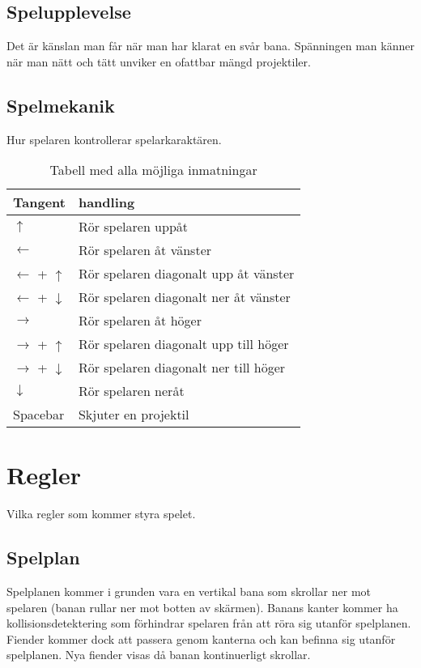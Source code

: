 \documentclass{TDP005mall}
\begin{document}
\subsection{Spelupplevelse}
Det är känslan man får när man har klarat en svår bana.
Spänningen man känner när man nätt och tätt unviker en ofattbar mängd projektiler.

\subsection{Spelmekanik}
Hur spelaren kontrollerar spelarkaraktären.
\begin{table}[H]
\caption{Tabell med alla möjliga inmatningar}
\begin{tabularx}{\linewidth}{|l|X|}
\hline
  Tangent & handling \\\hline
  $\uparrow$ & Rör spelaren uppåt \\\hline
  $\leftarrow$ & Rör spelaren åt vänster \\\hline
  $\leftarrow$ + $\uparrow$ & Rör spelaren diagonalt upp åt vänster \\\hline
  $\leftarrow$ + $\downarrow$ & Rör spelaren diagonalt ner åt vänster \\\hline
  $\rightarrow$ & Rör spelaren åt höger \\\hline
  $\rightarrow$ + $\uparrow$ & Rör spelaren diagonalt upp till höger \\\hline
  $\rightarrow$ + $\downarrow$ & Rör spelaren diagonalt ner till höger \\\hline
  $\downarrow$ & Rör spelaren neråt \\\hline
  Spacebar & Skjuter en projektil \\\hline  
\end{tabularx}
\end{table}
\clearpage
\section{Regler}
Vilka regler som kommer styra spelet.
\subsection{Spelplan}

Spelplanen kommer i grunden vara en vertikal bana som skrollar ner mot spelaren (banan rullar ner mot botten av skärmen).
Banans kanter kommer ha kollisionsdetektering som förhindrar spelaren från att röra sig utanför spelplanen.
Fiender kommer dock att passera genom kanterna och kan befinna sig utanför spelplanen. Nya fiender visas då banan kontinuerligt skrollar.
\end{document}
